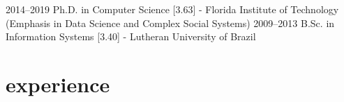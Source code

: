 \documentclass[]{cv-style}          %
\begin{document}
\begin{entrylist}
\entry
{2014--2019}
{Ph.D. {\normalfont in Computer Science [3.63] - }}
{Florida Institute of Technology}
{(Emphasis in Data Science and Complex Social Systems)}
{\vspace{-0.3cm}}
\entry
{2009--2013}
{B.Sc. {\normalfont in Information Systems [3.40] - }}
{Lutheran University of Brazil}
{\vspace{-0.4cm}}
\end{entrylist}


\section{experience}
\end{document}
